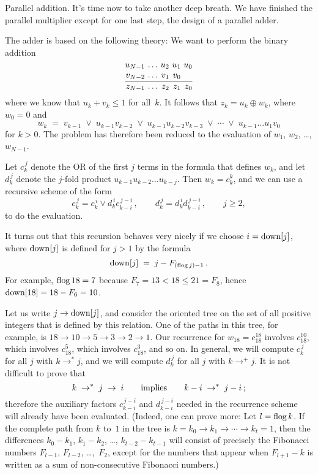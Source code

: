 Parallel addition. It's time now to take another deep breath. We
have finished the parallel multiplier except for one last step, the
design of a parallel adder.

The adder is based on the following theory:
We want to perform the binary addition
$$\vbox{\halign{\hfil$#$&&\ \hfil$#$\cr
u_{N-1}&\ldots&u_2&u_1&u_0\cr
v_{N-2}&\ldots&v_1&v_0\cr
\noalign{\kern2pt\hrule\kern4pt}
z_{N-1}&\ldots&z_2&z_1&z_0\cr}}$$
where we know that $u_k+v_k\le1$ for all~$k$. It follows that $z_k=u_k\oplus
w_k$, where $w_0=0$ and
$$ w_k\;=\;v_{k-1}\;\lor\;u_{k-1}v_{k-2}\;\lor\;u_{k-1}u_{k-2}v_{k-3}\;\lor
\;\cdots\;\lor\;u_{k-1}\ldots u_1v_0$$
for $k>0$. The problem has therefore been reduced to the evaluation
of $w_1$, $w_2$, \dots, $w_{N-1}$.

Let $c_k^{\,j}$ denote the {\sc OR} of the first $j$ terms in the formula
that defines $w_k$, and let $d_k^{\,j}$ denote the $j$-fold product
$u_{k-1}u_{k-2}\ldots u_{k-j}$.
Then $w_k=c_k^k$, and we can use a recursive scheme of the form
$$c_k^{\,j}=c_k^{\,i}\lor d_k^{\,i}c_{k-i}^{\,j-i}\,,\qquad
d_k^{\,j}=d_k^{\,i}d_{k-i}^{\,j-i}\,,\qquad j\ge2,$$
to do the evaluation.

\def\down{\mathop{\rm down}}
It turns out that this recursion behaves very nicely if we choose
$i=\down[j]$, where $\down[j]$ is defined for $j>1$ by the formula
$$\down[j]\;=\;j-F_{(\flog j)-1}\,.$$
For example, $\mathop{\rm flog}\nolimits18=7$ because $F_7=13<18\le21=F_8$,
hence $\down[18]=18-F_6=10$.

Let us write $j\to\down[j]$, and consider the oriented tree on the set
of all positive integers that is defined by this relation. One of the
paths in this tree, for example, is $18\to10\to5\to3\to2\to1$. Our
recurrence for $w_{18}=c_{18}^{18}$ involves $c_{18}^{10}$, which
involves $c_{18}^5$, which involves $c_{18}^3$, and so on. In general,
we will compute $c_k^{\,j}$ for all $j$ with $k\to^*j$, and we will
compute $d_k^{\,j}$ for all $j$ with $k\to^+j$. It is not difficult to
prove that $$k\;\to^*\;j\;\to\;i\qquad\hbox{implies}\qquad
k-i\;\to^*\;j-i\,;$$ therefore the auxiliary factors $c_{k-i}^{\,j-i}$
and $d_{k-i}^{\,j-i}$ needed in the recurrence scheme will already
have been evaluated. (Indeed, one can prove more: Let $l=\mathop{\rm flog}\nolimits k$. If
the complete path from $k$ to~$1$ in the tree is $k=k_0\to
k_1\to\cdots\to k_t=1$, then the differences $k_0-k_1$, $k_1-k_2$,
\dots, $k_{t-2}-k_{t-1}$ will consist of precisely the Fibonacci
numbers $F_{l-1}$, $F_{l-2}$, \dots,~$F_2$, except for the numbers that
appear when $F_{l+1}-k$ is written as a sum of non-consecutive
Fibonacci numbers.)

